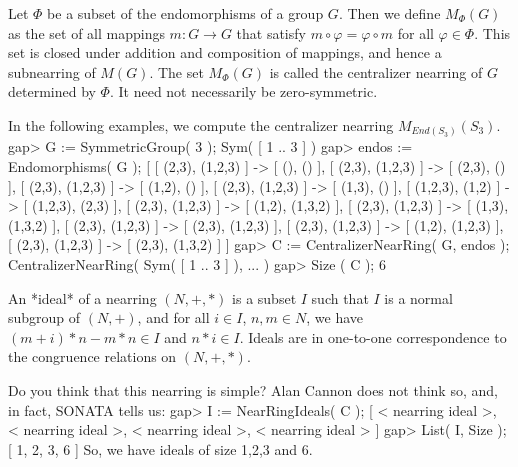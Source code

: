 Let $\Phi$ be a subset of the endomorphisms of a group $G$.
Then we define $M_{\Phi} (G)$ as the set of all
mappings $m : G \to G$ that satisfy $m \circ \varphi =
\varphi \circ m$ for all $\varphi \in \Phi$.
This set is closed under addition and composition of
mappings, and hence a subnearring of $M(G)$.
The set $M_{\Phi} (G)$ is called the centralizer nearring
of $G$ determined by $\Phi$. It need not necessarily be
zero-symmetric.

In the following examples, we compute the centralizer nearring
$M_{End (S_3)} (S_3)$.
\beginexample
    gap> G := SymmetricGroup( 3 );
    Sym( [ 1 .. 3 ] )
    gap> endos := Endomorphisms( G );
    [ [ (2,3), (1,2,3) ] -> [ (), () ],
      [ (2,3), (1,2,3) ] -> [ (2,3), () ],
      [ (2,3), (1,2,3) ] -> [ (1,2), () ], 
      [ (2,3), (1,2,3) ] -> [ (1,3), () ], 
      [ (1,2,3), (1,2) ] -> [ (1,2,3), (2,3) ], 
      [ (2,3), (1,2,3) ] -> [ (1,2), (1,3,2) ], 
      [ (2,3), (1,2,3) ] -> [ (1,3), (1,3,2) ], 
      [ (2,3), (1,2,3) ] -> [ (2,3), (1,2,3) ], 
      [ (2,3), (1,2,3) ] -> [ (1,2), (1,2,3) ], 
      [ (2,3), (1,2,3) ] -> [ (2,3), (1,3,2) ] ]
    gap> C := CentralizerNearRing( G, endos );
    CentralizerNearRing( Sym( [ 1 .. 3 ] ), ... )
    gap> Size ( C );
    6
\endexample

An *ideal* of a nearring $(N,+,*)$ is a subset $I$ such that
$I$ is a normal subgroup of $(N,+)$, and
for all $i \in I$, $n,m \in N$, we have
$(m+i)*n - m*n \in I$ and $n*i \in I$. Ideals are in
one-to-one correspondence to the congruence relations
on $(N,+,*)$.


Do you think that this nearring is simple? Alan Cannon does not think so,
and, in fact, SONATA tells us:
\beginexample
    gap> I := NearRingIdeals( C );
    [ < nearring ideal >, < nearring ideal >, < nearring ideal >, 
      < nearring ideal > ]
    gap> List( I, Size );
    [ 1, 2, 3, 6 ]
\endexample 
So, we have ideals of size 1,2,3 and 6.




